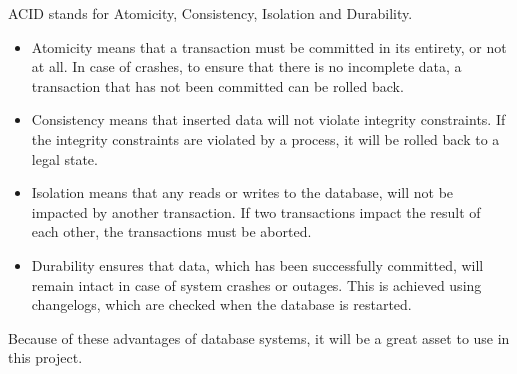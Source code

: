 ACID stands for Atomicity, Consistency, Isolation and Durability.

\begin{itemize}
    \item Atomicity means that a transaction must be committed in its entirety, or not at all. In case of crashes, to ensure that there is no incomplete data, a transaction that has not been committed can be rolled back.
    \item Consistency means that inserted data will not violate integrity constraints. If the integrity constraints are violated by a process, it will be rolled back to a legal state. 
    \item Isolation means that any reads or writes to the database, will not be impacted by another transaction. If two transactions impact the result of each other, the transactions must be aborted.
    \item Durability ensures that data, which has been successfully committed, will remain intact in case of system crashes or outages. This is achieved using changelogs, which are checked when the database is restarted.
\end{itemize}
\cite{ACID}

Because of these advantages of database systems, it will be a great asset to use in this project.